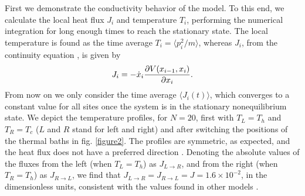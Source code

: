 First we demonstrate the conductivity behavior of the model.
To this end, we calculate the local heat flux $J_i$ and temperature $T_i$, performing the numerical integration
for long enough times to reach the stationary state.
The local temperature is found as the time average $T_i= \langle p_i^2 / m \rangle$, whereas
$J_i$,  from the continuity equation
\cite{Hu1998}, is given by
%
\begin{equation}
\label{heatflux}
J_i=-\dot x_i {{\partial V(x_{i-1},x_{i})} \over {\partial x_i}}.
\end{equation}
%
From now on we only consider the time average $\langle J_i (t)\rangle$, which converges to a constant value for all sites once the system is in the stationary nonequilibrium state. We depict the temperature profiles, for $N=20$, first with $T_L=T_h$ and $T_R=T_c$
($L$ and $R$ stand for left and right) and after switching the positions of the thermal baths in fig. \ref{figure2}. The profiles are symmetric, as expected, and the heat flux does not have a preferred direction  \cite{Hu1998,Terraneo2002}. Denoting the absolute values of the fluxes from the left (when $T_L=T_h$) as
$J_{L\rightarrow R}$, and from the right (when $T_R=T_h$) as
$J_{R\rightarrow L}$, we find that $J_{L\rightarrow R}=J_{R\rightarrow L}=J=1.6\times 10^{-2}$, in the dimensionless units, consistent with the values found in other models \cite{Terraneo2002,Hu1998}.
